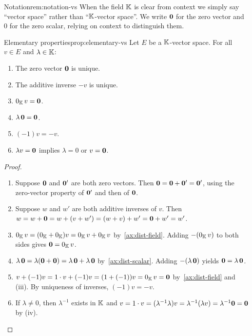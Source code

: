 \begin{remark}{Notation}{rem:notation-vs}
When the field ${\mathbb{K}}$ is clear from context we simply say ``vector space''
rather than ``${\mathbb{K}}$-vector space''. We write $\mathbf{0}$ for the zero vector
and $0$ for the zero scalar, relying on context to distinguish them.
\end{remark}

\begin{proposition}{Elementary properties}{prop:elementary-vs}
Let $E$ be a ${\mathbb{K}}$-vector space. For all $v\in E$ and $\lambda\in{\mathbb{K}}$:
\begin{enumerate}[label=(\roman*)]
  \item The zero vector $\mathbf{0}$ is unique.
  \item The additive inverse $-v$ is unique.
  \item $0_{\mathbb{K}}\, v = \mathbf{0}$.
  \item $\lambda\,\mathbf{0} = \mathbf{0}$.
  \item $(-1)v = -v$.
  \item $\lambda v = \mathbf{0}$ implies $\lambda = 0$ or $v = \mathbf{0}$.
\end{enumerate}
\end{proposition}

\begin{proof}
\begin{enumerate}[label=(\roman*)]
  \item Suppose $\mathbf{0}$ and $\mathbf{0}'$ are both zero vectors. Then
    $\mathbf{0} = \mathbf{0} + \mathbf{0}' = \mathbf{0}'$, using the zero-vector
    property of $\mathbf{0}'$ and then of $\mathbf{0}$.

  \item Suppose $w$ and $w'$ are both additive inverses of $v$. Then
    $w = w + \mathbf{0} = w + (v + w') = (w + v) + w' = \mathbf{0} + w' = w'$.

  \item $0_{\mathbb{K}}\,v = (0_{\mathbb{K}} + 0_{\mathbb{K}})v = 0_{\mathbb{K}}\,v + 0_{\mathbb{K}}\,v$ by~\ref{ax:dist-field}.
    Adding $-(0_{\mathbb{K}}\,v)$ to both sides gives $\mathbf{0} = 0_{\mathbb{K}}\,v$.

  \item $\lambda\,\mathbf{0} = \lambda(\mathbf{0} + \mathbf{0}) =
    \lambda\,\mathbf{0} + \lambda\,\mathbf{0}$ by~\ref{ax:dist-scalar}. Adding
    $-(\lambda\,\mathbf{0})$ yields $\mathbf{0} = \lambda\,\mathbf{0}$.

  \item $v + (-1)v = 1\cdot v + (-1)v = (1+(-1))v = 0_{\mathbb{K}}\,v = \mathbf{0}$
    by~\ref{ax:dist-field} and (iii). By uniqueness of inverses,
    $(-1)v = -v$.

  \item If $\lambda\neq 0$, then $\lambda^{-1}$ exists in ${\mathbb{K}}$ and
    $v = 1\cdot v = (\lambda^{-1}\lambda)v = \lambda^{-1}(\lambda v) =
    \lambda^{-1}\mathbf{0} = \mathbf{0}$ by (iv). \qedhere
\end{enumerate}
\end{proof}


